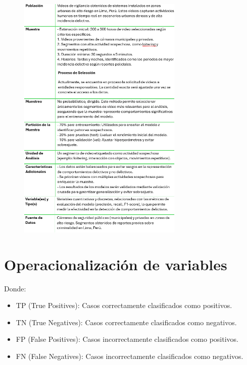 \documentclass[listof=nochaptergap,12pt,times,authoryear]{report}
\begin{document}
\begin{figure}[h] %
    \centering
    \includegraphics[width=0.7\textwidth]{TABLA MUESTRA.png} %
    \label{fig:ejemplo} %
\end{figure}

\chapter{Operacionalización de variables}
Donde:
\begin{itemize}
    \item TP (True Positives): Casos correctamente clasificados como positivos.
    \item TN (True Negatives): Casos correctamente clasificados como negativos.
    \item FP (False Positives): Casos incorrectamente clasificados como positivos.
    \item FN (False Negatives): Casos incorrectamente clasificados como negativos.
\end{itemize}
\end{document}
